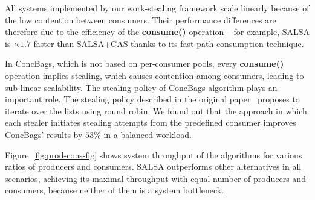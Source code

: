All systems implemented by our work-stealing framework scale linearly because of the low contention between consumers. 
Their performance differences are therefore due to the efficiency of the {\bf consume()} operation -- for example, SALSA is $\times1.7$ faster than SALSA+CAS thanks to its fast-path consumption technique.

In ConcBags, which is not based on per-consumer pools, every {\bf consume()} operation implies stealing, which causes contention among consumers, leading to sub-linear scalability. The stealing policy of ConcBags algorithm plays an important role. The stealing policy described in the original paper~\cite{Sundell:2011:LAC:1989493.1989550} proposes to iterate over the lists using round robin. We found out that the approach in which each stealer initiates stealing attempts from the predefined consumer improves ConcBags' results by $53$\% in a balanced workload.

Figure~\ref{fig:prod-cons-fig} shows system throughput of the algorithms for various ratios of producers and consumers. 
SALSA outperforms other alternatives in all scenarios, achieving its maximal throughput with equal number of producers and consumers, because neither of them is a system bottleneck. 

%

